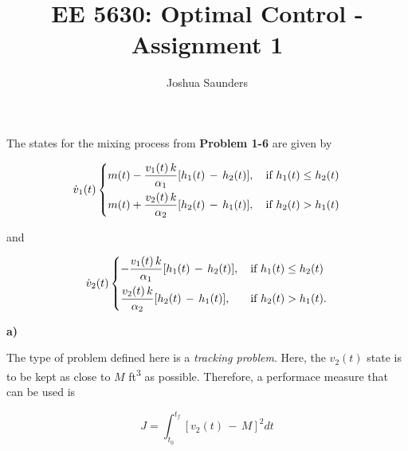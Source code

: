 \documentclass[12pt]{article}
\newenvironment{problem}[2][Problem]{\begin{trivlist}
\item[\hskip \labelsep {\bfseries #1}\hskip \labelsep {\bfseries #2.}]}{\end{trivlist}}
\newcommand\ddfrac[2]{\frac{\displaystyle #1}{\displaystyle #2}}
\begin{document}
 
 
\title{EE 5630: Optimal Control - Assignment 1}%
\author{Joshua Saunders\\ %
} %
 
\maketitle
 
\begin{problem}{2-1} %
\end{problem}
 
The states for the mixing process from \textbf{Problem 1-6} are given by

\begin{equation}
\dot{v}_1 (t) 
\begin{dcases}
    m(t) - \ddfrac{v_1(t) \, k}{\alpha _1 }[h_1(t) \, - \, h_2(t)],  \, & \text{if } h_1(t) \leq h_2(t) \\
    m(t) + \ddfrac{v_2(t) \, k}{\alpha _2 }[h_2(t) \, - \, h_1(t)],  \, & \text{if } h_2(t) > h_1(t) 
\end{dcases}
\end{equation}

and

\begin{equation}
\dot{v}_2 (t) 
\begin{dcases}
    - \ddfrac{v_1(t) \, k}{\alpha _1 }[h_1(t) \, - \, h_2(t)],  \, & \text{if } h_1(t) \leq h_2(t) \\ 
      \ddfrac{v_2(t) \, k}{\alpha _2 }[h_2(t) \, - \, h_1(t)],  \, & \text{if } h_2(t) > h_1(t). 
\end{dcases}
\end{equation}

\noindent \textbf{a)} \newline

The type of problem defined here is a \textit{tracking problem}. Here, the $v_2 (t)$ state is to be kept
as close to $M$ ft\textsuperscript{3} as possible. Therefore, a performace measure that can be used is

\begin{equation}
    J = \int_{t_0}^{t_f} [v_2 (t) \, - \, M]^2 dt
\end{equation}
\end{document}
